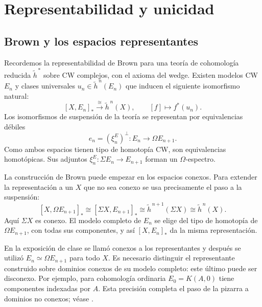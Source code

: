 \section{Representabilidad y unicidad}

\subsection{Brown y los espacios representantes}
Recordemos la representabilidad de Brown para una teoría de cohomología reducida $\widetilde h^{\,*}$ sobre CW complejos, con el axioma del wedge. Existen modelos CW $E_n$ y clases universales $u_n\in\widetilde h^{\,n}(E_n)$ que inducen el siguiente isomorfismo natural:
\[
[X,E_n]_*\xrightarrow{\ \cong\ }\widetilde h^{\,n}(X),
\qquad[f]\longmapsto f^*(u_n).
\]
Los isomorfismos de suspensión de la teoría se representan por equivalencias débiles
\[
e_n=(\xi^E_n)^\perp\colon E_n\longrightarrow\Omega E_{n+1}.
\]
Como ambos espacios tienen tipo de homotopía CW, son equivalencias homotópicas. Sus adjuntos $\xi^E_n\colon\Sigma E_n\to E_{n+1}$ forman un $\Omega$-espectro.

La construcción de Brown puede empezar en los espacios conexos. Para extender la representación a un $X$ que no sea conexo se usa precisamente el paso a la suspensión:
\[
[X,\Omega E_{n+1}]_*\cong[\Sigma X,E_{n+1}]_*
\cong\widetilde h^{\,n+1}(\Sigma X)
\cong\widetilde h^{\,n}(X).
\]
Aquí $\Sigma X$ es conexo. El modelo completo de $E_n$ se elige del tipo de homotopía de $\Omega E_{n+1}$, con todas sus componentes, y así $[X,E_n]_*$ da la misma representación.

\begin{nota}
En la exposición de clase se llamó conexos a los representantes y después se utilizó $E_n\simeq\Omega E_{n+1}$ para todo $X$. Es necesario distinguir el representante construido sobre dominios conexos de su modelo completo: este último puede ser disconexo. Por ejemplo, para cohomología ordinaria $E_0=K(A,0)$ tiene componentes indexadas por $A$. Esta precisión completa el paso de la pizarra a dominios no conexos; véase \cite[Teorema~2.5.2.11]{malkiewich}.
\end{nota}

